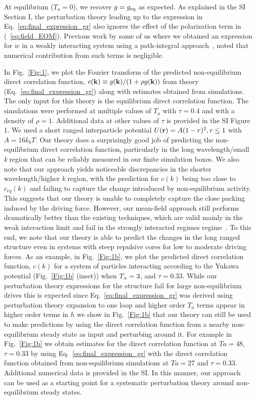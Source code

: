 \documentclass[superscriptaddress, twocolumn, prl, longbibliography, nofootinbib]{revtex4-1}
\newcommand{\A}{\text{\tiny{A}}}
\begin{document}
At equilibrium ($T_a=0$), we recover $g=g_{\rm eq}$ as expected. As explained in the SI Section I, the perturbation theory leading up to the expression in Eq.~\ref{eq:final_expression_gr} also ignores the effect of the polarization term in (~\ref{eq:field_EOM}). Previous work by some of us where we obtained an expression for $\dot{w}$ in a weakly interacting system using a path-integral approach~\cite{Suri2020}, noted that numerical contribution from such terms is negligible. 

In Fig.~\ref{Fig:1}, we plot the Fourier transform of the predicted non-equilibrium direct correlation function, $c({\bf k})\equiv g({\bf k})/(1+\rho g({\bf k}))$ from theory (Eq.~\ref{eq:final_expression_gr}) along with estimates obtained from simulations. The only input for this theory is the equilibrium direct correlation function. The simulations were performed at multiple values of $T_a$ with $\tau=0.4$ and with a density of $\rho=1$. Additional data at other values of $\tau$ is provided in the SI Figure 1. We used a short ranged interparticle potential $U({\bf r})=A (1- r)^2, r\leq 1$ with $A=16 k_b T$. Our theory does a surprisingly good job of predicting the non-equilibrium direct correlation function, particularly in the long wavelength/small \textit{k} region that can be reliably measured in our finite simulation boxes. We also note that our approach yields noticeable discrepancies in the shorter wavelength/higher \textit{k} region, with the prediction for $c(k)$ being too close to $c_{eq}(k)$ and failing to capture the change introduced by non-equilibrium activity. This suggests that our theory is unable to completely capture the close packing induced by the driving force. However, our mean-field approach still performs dramatically better than the existing techniques, which are valid mainly in the weak interaction limit and fail in the strongly interacted regimes regime~\cite{Dean_1996,Demery2011}. 
To this end, we note that our theory is able to predict the changes in the long ranged structure even in systems with steep repulsive cores for low to moderate driving forces. As an example, in Fig.~\ref{Fig:1b}, we plot the predicted direct correlation function, $c(k)$ for a system of particles interacting according to the Yukawa potential (Fig.~\ref{Fig:1b} (inset)) when $T_\A=3$, and $\tau=0.33$. While
our perturbation theory expressions for the structure fail for large non-equilibrium drives \textendash this is expected since Eq.~\ref{eq:final_expression_gr} was derived using perturbation theory expansion to one loop and higher order $T_a$  terms appear in higher order terms in $h$ \textendash we show in Fig.~\ref{Fig:1b} that our theory can still be used to make predictions by using the direct correlation function from a nearby non-equilibrium steady state as input and perturbing around it. For example in Fig.~\ref{Fig:1b} we obtain estimates for the direct correlation function at $Ta=48$, $\tau=0.33$ by using Eq.~\ref{eq:final_expression_gr} with the direct correlation function obtained from non-equilibrium simulations at $Ta=27$ and $\tau=0.33$. Additional numerical data is provided in the SI. In this manner, our approach can be used as a starting point for a systematic perturbation theory around non-equilibrium steady states. 
\end{document}
